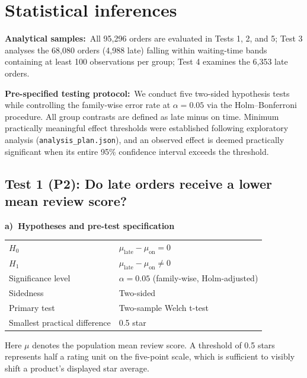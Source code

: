 \documentclass[10pt,a4paper,twocolumn]{article}
\newcommand{\field}[2]{\textbf{#1}~#2\par}
\newcommand{\tpart}[2]{\par\needspace{12\baselineskip}\smallskip\textbf{#1)~#2}\par}
\newcommand{\code}[1]{\texttt{#1}}
\begin{document}
\section{Statistical inferences}
\field{Analytical samples:}{All 95,296 orders are evaluated in Tests 1, 2, and 5; Test 3 analyses the 68,080 orders
(4,988 late) falling within waiting-time bands containing at least 100 observations per group; Test 4 examines the
6,353 late orders.}

\field{Pre-specified testing protocol:}{We conduct five two-sided hypothesis tests while controlling the family-wise
error rate at $\alpha=0.05$ via the Holm--Bonferroni procedure. All group contrasts are defined as late minus on time.
Minimum practically meaningful effect thresholds were established following exploratory analysis (\code{analysis\_plan.json}),
and an observed effect is deemed practically significant when its entire 95\% confidence interval exceeds the threshold.}

\subsection*{Test 1 (P2): Do late orders receive a lower mean review score?}
\tpart{a}{Hypotheses and pre-test specification}
{\small
\begin{tabularx}{\linewidth}{@{}K{3.4cm} Y@{}}
\toprule
$H_0$ & $\mu_{\text{late}}-\mu_{\text{on}}=0$ \\
$H_1$ & $\mu_{\text{late}}-\mu_{\text{on}}\neq0$ \\
Significance level & $\alpha=0.05$ (family-wise, Holm-adjusted) \\
Sidedness & Two-sided \\
Primary test & Two-sample Welch t-test \\
Smallest practical difference & 0.5 star \\
\bottomrule
\end{tabularx}}

Here $\mu$ denotes the population mean review score. A threshold of 0.5 stars represents half a rating unit on the
five-point scale, which is sufficient to visibly shift a product's displayed star average.
\end{document}
